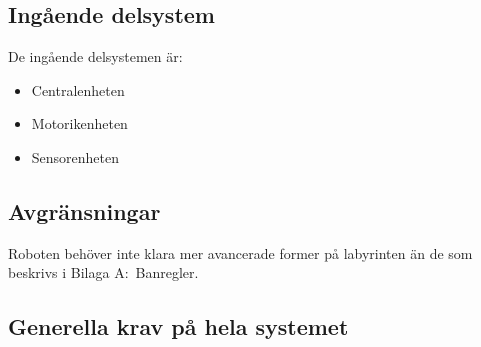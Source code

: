 \documentclass[a4paper,titlepage,12pt]{article}
\begin{document}
	\subsection{Ingående delsystem}
    De ingående delsystemen är:
    
    \begin{itemize}
        \item Centralenheten
        \item Motorikenheten
        \item Sensorenheten
    \end{itemize}
	\subsection{Avgränsningar}
	Roboten behöver inte klara mer avancerade former på labyrinten än de som beskrivs i Bilaga A:\ Banregler.
	\subsection{Generella krav på hela systemet}
\end{document}

